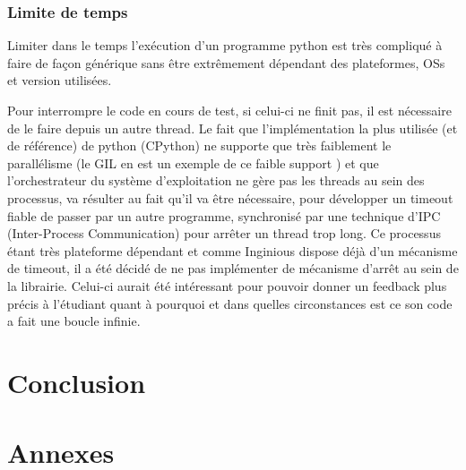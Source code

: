 \documentclass[a4paper]{report}
\begin{document}
\subsection{Limite de temps}
Limiter dans le temps l'exécution d'un programme python est très compliqué à faire de façon générique sans être extrêmement dépendant des plateformes, OSs et version utilisées.

Pour interrompre le code en cours de test, si celui-ci ne finit pas, il est nécessaire de le faire depuis un autre thread.
Le fait que l'implémentation la plus utilisée (et de référence) de python (CPython) ne supporte que très faiblement le parallélisme (le GIL en est un exemple de ce faible support \cite{archiveThreadStateGIDPython}\cite{pythonGlobalInterpreterLockPython}) et que l'orchestrateur du système d'exploitation ne gère pas les threads au sein des processus, va résulter au fait qu'il va être nécessaire, pour développer un timeout fiable de passer par un autre programme, synchronisé par une technique d'IPC (Inter-Process Communication) pour arrêter un thread trop long.
Ce processus étant très plateforme dépendant et comme Inginious dispose déjà d'un mécanisme de timeout, il a été décidé de ne pas implémenter de mécanisme d'arrêt au sein de la librairie.
Celui-ci aurait été intéressant pour pouvoir donner un feedback plus précis à l'étudiant quant à pourquoi et dans quelles circonstances est ce son code a fait une boucle infinie.

\chapter{Conclusion}



 

\chapter*{Annexes}
\end{document}

